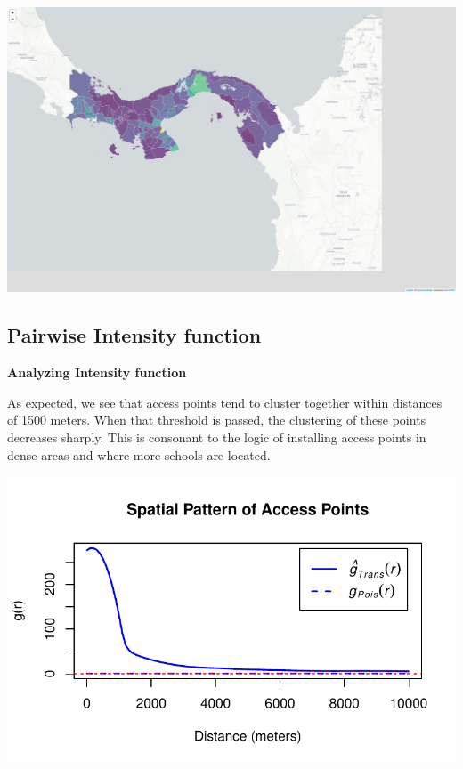 \documentclass[
  letterpaper,
  DIV=11,
  numbers=noendperiod]{scrartcl}
\begin{document}
\includegraphics{index_files/figure-pdf/morans-i-plots-1.pdf}

\subsection{Pairwise Intensity
function}\label{pairwise-intensity-function}

\textbf{Analyzing Intensity function}

As expected, we see that access points tend to cluster together within
distances of 1500 meters. When that threshold is passed, the clustering
of these points decreases sharply. This is consonant to the logic of
installing access points in dense areas and where more schools are
located.

\includegraphics{index_files/figure-pdf/pairwise-intensity-1.pdf}
\end{document}
